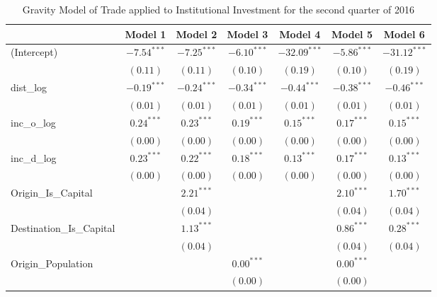 \begin{table}
	\begin{center}
		\small
		\caption[Gravity Model of trade for Q2 2016]{Gravity Model of Trade applied to Institutional Investment for the second quarter of 2016}
		\begin{tabular}{l c c c c c c }
			\hline
			& Model 1 & Model 2 & Model 3 & Model 4 & Model 5 & Model 6 \\
			\hline
			(Intercept)                  & $-7.54^{***}$ & $-7.25^{***}$ & $-6.10^{***}$ & $-32.09^{***}$ & $-5.86^{***}$ & $-31.12^{***}$ \\
			& $(0.11)$      & $(0.11)$      & $(0.10)$      & $(0.19)$       & $(0.10)$      & $(0.19)$       \\
			dist\_log                    & $-0.19^{***}$ & $-0.24^{***}$ & $-0.34^{***}$ & $-0.44^{***}$  & $-0.38^{***}$ & $-0.46^{***}$  \\
			& $(0.01)$      & $(0.01)$      & $(0.01)$      & $(0.01)$       & $(0.01)$      & $(0.01)$       \\
			inc\_o\_log                  & $0.24^{***}$  & $0.23^{***}$  & $0.19^{***}$  & $0.15^{***}$   & $0.17^{***}$  & $0.15^{***}$   \\
			& $(0.00)$      & $(0.00)$      & $(0.00)$      & $(0.00)$       & $(0.00)$      & $(0.00)$       \\
			inc\_d\_log                  & $0.23^{***}$  & $0.22^{***}$  & $0.18^{***}$  & $0.13^{***}$   & $0.17^{***}$  & $0.13^{***}$   \\
			& $(0.00)$      & $(0.00)$      & $(0.00)$      & $(0.00)$       & $(0.00)$      & $(0.00)$       \\
			Origin\_Is\_Capital          &               & $2.21^{***}$  &               &                & $2.10^{***}$  & $1.70^{***}$   \\
			&               & $(0.04)$      &               &                & $(0.04)$      & $(0.04)$       \\
			Destination\_Is\_Capital     &               & $1.13^{***}$  &               &                & $0.86^{***}$  & $0.28^{***}$   \\
			&               & $(0.04)$      &               &                & $(0.04)$      & $(0.04)$       \\
			Origin\_Population           &               &               & $0.00^{***}$  &                & $0.00^{***}$  &                \\
			&               &               & $(0.00)$      &                & $(0.00)$      &                \\

\end{tabular}
\end{center}
\end{table}
